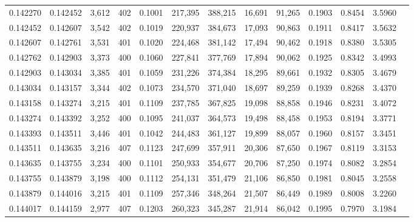 \begin{tabular}{rrrrrrrrrrrrr}
0.142270 & 0.142452 & 3,612 & 402 &                                     0.1001 & 217,395 & 388,215 &  16,691 &  91,265 & 0.1903 & 0.8454 & 3.5960 \\
0.142452 & 0.142607 & 3,542 & 402 &                                     0.1019 & 220,937 & 384,673 &  17,093 &  90,863 & 0.1911 & 0.8417 & 3.5632 \\
0.142607 & 0.142761 & 3,531 & 401 &                                     0.1020 & 224,468 & 381,142 &  17,494 &  90,462 & 0.1918 & 0.8380 & 3.5305 \\
0.142762 & 0.142903 & 3,373 & 400 &                                     0.1060 & 227,841 & 377,769 &  17,894 &  90,062 & 0.1925 & 0.8342 & 3.4993 \\
0.142903 & 0.143034 & 3,385 & 401 &                                     0.1059 & 231,226 & 374,384 &  18,295 &  89,661 & 0.1932 & 0.8305 & 3.4679 \\
0.143034 & 0.143157 & 3,344 & 402 &                                     0.1073 & 234,570 & 371,040 &  18,697 &  89,259 & 0.1939 & 0.8268 & 3.4370 \\
0.143158 & 0.143274 & 3,215 & 401 &                                     0.1109 & 237,785 & 367,825 &  19,098 &  88,858 & 0.1946 & 0.8231 & 3.4072 \\
0.143274 & 0.143392 & 3,252 & 400 &                                     0.1095 & 241,037 & 364,573 &  19,498 &  88,458 & 0.1953 & 0.8194 & 3.3771 \\
0.143393 & 0.143511 & 3,446 & 401 &                                     0.1042 & 244,483 & 361,127 &  19,899 &  88,057 & 0.1960 & 0.8157 & 3.3451 \\
0.143511 & 0.143635 & 3,216 & 407 &                                     0.1123 & 247,699 & 357,911 &  20,306 &  87,650 & 0.1967 & 0.8119 & 3.3153 \\
0.143635 & 0.143755 & 3,234 & 400 &                                     0.1101 & 250,933 & 354,677 &  20,706 &  87,250 & 0.1974 & 0.8082 & 3.2854 \\
0.143755 & 0.143879 & 3,198 & 400 &                                     0.1112 & 254,131 & 351,479 &  21,106 &  86,850 & 0.1981 & 0.8045 & 3.2558 \\
0.143879 & 0.144016 & 3,215 & 401 &                                     0.1109 & 257,346 & 348,264 &  21,507 &  86,449 & 0.1989 & 0.8008 & 3.2260 \\
0.144017 & 0.144159 & 2,977 & 407 &                                     0.1203 & 260,323 & 345,287 &  21,914 &  86,042 & 0.1995 & 0.7970 & 3.1984 \\

\end{tabular}

